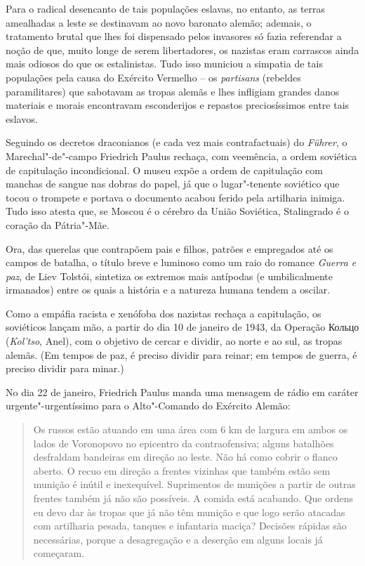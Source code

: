 Para o radical desencanto de tais populações eslavas, no entanto, as
terras amealhadas a leste se destinavam ao novo baronato alemão;
ademais, o tratamento brutal que lhes foi dispensado pelos invasores só
fazia referendar a noção de que, muito longe de serem libertadores, os
nazistas eram carrascos ainda mais odiosos do que os estalinistas. Tudo
isso municiou a simpatia de tais populações pela causa do Exército
Vermelho -- os \emph{partisans} (rebeldes paramilitares) que sabotavam
as tropas alemãs e lhes infligiam grandes danos materiais e morais
encontravam esconderijos e repastos preciosíssimos entre tais eslavos.

Seguindo os decretos draconianos (e cada vez mais contrafactuais) do
\emph{Führer}, o Marechal"-de"-campo Friedrich Paulus rechaça, com
veemência, a ordem soviética de capitulação incondicional. O museu expõe
a ordem de capitulação com manchas de sangue nas dobras do papel, já que
o lugar"-tenente soviético que tocou o trompete e portava o documento
acabou ferido pela artilharia inimiga. Tudo isso atesta que, se Moscou é
o cérebro da União Soviética, Stalingrado é o coração da Pátria"-Mãe.

Ora, das querelas que contrapõem pais e filhos, patrões e empregados até
os campos de batalha, o título breve e luminoso como um raio do romance
\emph{Guerra e paz}, de Liev Tolstói, sintetiza os extremos mais
antípodas (e umbilicalmente irmanados) entre os quais a história e a
natureza humana tendem a oscilar.

Como a empáfia racista e xenófoba dos nazistas rechaça a capitulação, os
soviéticos lançam mão, a partir do dia 10 de janeiro de 1943, da
Operação Кольцо (\emph{Kol'tso}, Anel), com o objetivo de cercar e
dividir, ao norte e ao sul, as tropas alemãs. (Em tempos de paz, é
preciso dividir para reinar; em tempos de guerra, é preciso dividir para
minar.)

No dia 22 de janeiro, Friedrich Paulus manda uma mensagem de rádio em
caráter urgente"-urgentíssimo para o Alto"-Comando do Exército Alemão:

\begin{quote}
Os russos estão atuando em uma área com 6 km de largura em ambos os
lados de Voronopovo no epicentro da contraofensiva; alguns batalhões
desfraldam bandeiras em direção ao leste. Não há como cobrir o flanco
aberto. O recuo em direção a frentes vizinhas que também estão sem
munição é inútil e inexequível. Suprimentos de munições a partir de
outras frentes também já não são possíveis. A comida está acabando. Que
ordens eu devo dar às tropas que já não têm munição e que logo serão
atacadas com artilharia pesada, tanques e infantaria maciça? Decisões
rápidas são necessárias, porque a desagregação e a deserção em alguns
locais já começaram.
\end{quote}

